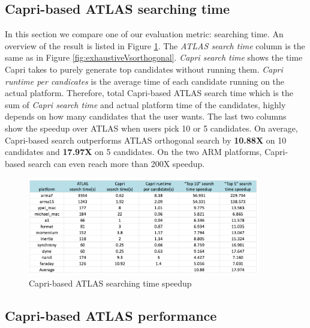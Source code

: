   \subsection{Capri-based ATLAS searching time}
  \label{sec:capri_atlas_searching}
  In this section we compare one of our evaluation metric: searching time. An overview of the result is listed in
  Figure \ref{fig:search_time}. The \textit{ATLAS search time} column is the same as in Figure \ref{fig:exhaustiveVsorthogonal}.
  \textit{Capri search time} shows the time Capri takes to purely generate top candidates without running them. 
  \textit{Capri runtime per candicates} is the average time of each candidate running on the actual platform.
  Therefore, total Capri-based ATLAS search time which is the sum of \textit{Capri search time} and actual platform time of the candidates,
  highly depends on how many candidates that the user wants. The last two columns show the speedup over ATLAS when users pick
  10 or 5 candidates. On average, Capri-based search outperforms ATLAS orthogonal search by \textbf{10.88X} on 10 candidates and \textbf{17.97X} on 
  5 candidates. On the two ARM platforms, Capri-based search can even reach more than 200X speedup.
  


  \begin{figure}[tbhp]
    \centering
    \includegraphics[width=0.9\textwidth]{images/timespeedup.png}
    \caption{Capri-based ATLAS searching time speedup}
    \label{fig:search_time}
  \end{figure}

  \subsection{Capri-based ATLAS performance}
  \label{sec:capri_atlas_performance}

